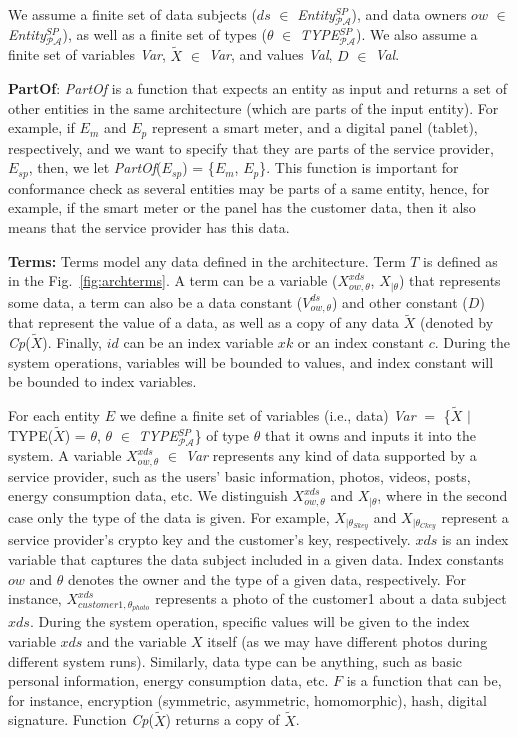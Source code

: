 \documentclass[a4paper]{article}
\begin{document}
We assume a finite set of data subjects ($ds$ $\in$ \textit{Entity}$^{SP}_{\mathcal{P}\mathcal{A}}$), and data owners $ow$ $\in$ \textit{Entity}$^{SP}_{\mathcal{P}\mathcal{A}}$), as well as a finite set of types ($\theta$ $\in$ \textit{TYPE}$^{SP}_{\mathcal{P}\mathcal{A}}$).  We also assume a finite set of variables \textit{Var}, $\tilde{X}$ $\in$ \textit{Var}, and values \textit{Val}, $D$ $\in$ \textit{Val}.  

\textbf{PartOf}: \textit{PartOf} is a function that expects an entity as input and returns a set of other entities in the same architecture (which are parts of the input entity). For example, if $E_m$ and $E_{p}$ represent a smart meter, and a digital panel (tablet), respectively, and we want to specify that they are parts of the service provider, $E_{sp}$, then, we let \textit{PartOf}($E_{sp}$) = \{$E_{m}$, $E_{p}$\}. This function is important for conformance check as several entities may be parts of a same entity, hence, for example, if the smart meter or the panel has the customer data, then it also means that the service provider has this data. 

\textbf{Terms:} Terms model any data defined in the architecture. Term $T$ is defined as in the Fig.~\ref{fig:archterms}.  A term can be a variable ($X^{xds}_{ow, \theta}$, $X_{|\theta}$) that represents some data, a term can also be a data constant ($V^{ds}_{ow, \theta}$) and other constant ($D$) that represent the value of a data,  as well as  a copy of any data $\tilde{X}$ (denoted by \textit{Cp}($\tilde{X}$). Finally, $id$ can be an index variable $xk$ or an index constant $c$. During the system operations,  variables will be bounded to values, and index constant will be bounded to index variables. 

For each entity $E$ we define a finite set of variables (i.e., data) \textit{Var} $=$ \{$\tilde{X}$ $|$ TYPE($\tilde{X}$) = $\theta$, $\theta$ $\in$ \textit{TYPE}$^{SP}_{\mathcal{P}\mathcal{A}}$\} of type $\theta$ that it owns and inputs it into the system.    
A variable $X^{xds}_{ow, \theta}$ $\in$ \textit{Var} represents any kind of data supported by a service provider, such as the users' basic information, photos, videos, posts, energy consumption data, etc. We distinguish $X^{xds}_{ow, \theta}$ and $X_{|\theta}$, where in the second case only the type of the data is given. For example, $X_{|\theta_{Skey}}$ and $X_{|\theta_{Ckey}}$ represent a service provider's crypto key and the customer's key, respectively. $xds$ is an index variable that captures the data subject included in a given data. Index constants $ow$ and $\theta$ denotes the owner and the type of a given data, respectively. For instance, $X^{xds}_{\textit{customer1}, \theta_{photo}}$ represents a photo of the  customer1 about a data subject $xds$. During the system operation, specific values will be given to the index variable $xds$ and the variable $X$ itself  (as we may have different photos during different system runs). Similarly, data type can be anything, such as basic personal information, energy consumption data, etc. $F$ is a function that can be, for instance, encryption (symmetric,  asymmetric, homomorphic), hash, digital signature. Function \textit{Cp}($\tilde{X}$) returns a copy of $\tilde{X}$.
 
\end{document}
